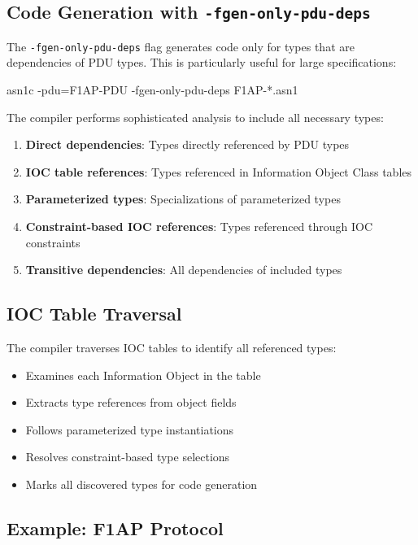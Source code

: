 \documentclass[english,oneside,12pt]{book}
\begin{document}
\subsection*{Code Generation with \texttt{-fgen-only-pdu-deps}}

The \texttt{-fgen-only-pdu-deps} flag generates code only for types that are dependencies 
of PDU types. This is particularly useful for large specifications:

\begin{bash}
asn1c -pdu=F1AP-PDU -fgen-only-pdu-deps F1AP-*.asn1
\end{bash}

The compiler performs sophisticated analysis to include all necessary types:

\begin{enumerate}
\item \textbf{Direct dependencies}: Types directly referenced by PDU types
\item \textbf{IOC table references}: Types referenced in Information Object Class tables
\item \textbf{Parameterized types}: Specializations of parameterized types
\item \textbf{Constraint-based IOC references}: Types referenced through IOC constraints
\item \textbf{Transitive dependencies}: All dependencies of included types
\end{enumerate}

\subsection*{IOC Table Traversal}

The compiler traverses IOC tables to identify all referenced types:

\begin{itemize}
\item Examines each Information Object in the table
\item Extracts type references from object fields
\item Follows parameterized type instantiations
\item Resolves constraint-based type selections
\item Marks all discovered types for code generation
\end{itemize}

\subsection*{Example: F1AP Protocol}
\end{document}
